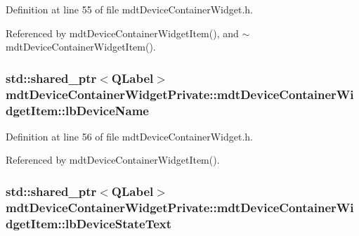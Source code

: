 Definition at line 55 of file mdt\-Device\-Container\-Widget.\-h.



Referenced by mdt\-Device\-Container\-Widget\-Item(), and $\sim$mdt\-Device\-Container\-Widget\-Item().

\hypertarget{classmdt_device_container_widget_private_1_1mdt_device_container_widget_item_a8233b97854de9e3b3c391d2f19f7320a}{
\subsubsection[{lb\-Device\-Name}]{\setlength{\rightskip}{0pt plus 5cm}std\-::shared\-\_\-ptr$<$Q\-Label$>$ mdt\-Device\-Container\-Widget\-Private\-::mdt\-Device\-Container\-Widget\-Item\-::lb\-Device\-Name}}\label{classmdt_device_container_widget_private_1_1mdt_device_container_widget_item_a8233b97854de9e3b3c391d2f19f7320a}


Definition at line 56 of file mdt\-Device\-Container\-Widget.\-h.



Referenced by mdt\-Device\-Container\-Widget\-Item().

\hypertarget{classmdt_device_container_widget_private_1_1mdt_device_container_widget_item_a90e0b939fb6e476fc2d17e620d2f6ed6}{
\subsubsection[{lb\-Device\-State\-Text}]{\setlength{\rightskip}{0pt plus 5cm}std\-::shared\-\_\-ptr$<$Q\-Label$>$ mdt\-Device\-Container\-Widget\-Private\-::mdt\-Device\-Container\-Widget\-Item\-::lb\-Device\-State\-Text}}\label{classmdt_device_container_widget_private_1_1mdt_device_container_widget_item_a90e0b939fb6e476fc2d17e620d2f6ed6}


